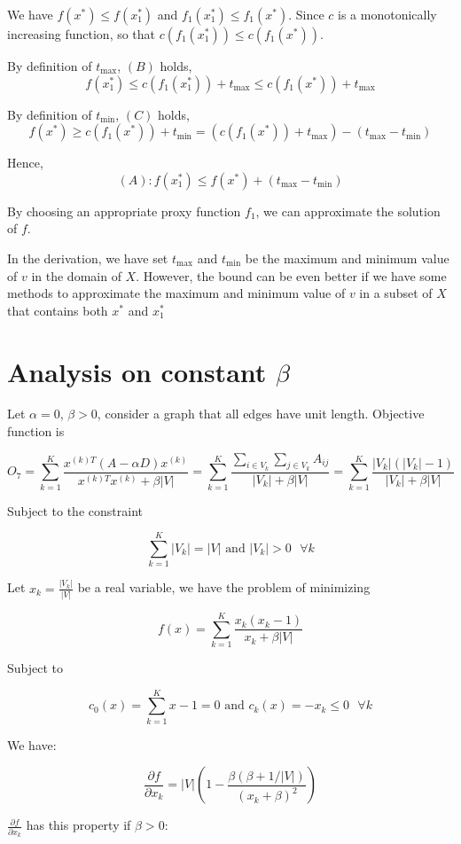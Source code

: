 We have $f(x^*) \leq f(x^*_1)$ and $f_1(x^*_1) \leq f_1(x^*)$.
Since $c$ is a monotonically increasing function, so that $c(f_1(x^*_1)) \leq c(f_1(x^*))$.


By definition of $t_{\max}$, $(B)$ holds,
\[
    f(x^*_1) \leq c(f_1(x^*_1)) + t_{\max} \leq c(f_1(x^*)) + t_{\max}
\]

By definition of $t_{\min}$, $(C)$ holds,
\[
    f(x^*) \geq c(f_1(x^*)) + t_{\min} = (c(f_1(x^*)) + t_{\max}) - (t_{\max} - t_{\min})
\]

Hence,
\[
    (A): f(x^*_1) \leq f(x^*) + (t_{\max} - t_{\min})
\]

By choosing an appropriate proxy function $f_1$, we can approximate the solution of $f$.

In the derivation, we have set $t_{\max}$ and $t_{\min}$ be the maximum and minimum value of $v$ in the domain of $X$.
However, the bound can be even better if we have some methods to approximate the maximum and minimum value of $v$ in a subset of $X$ that contains both $x^*$ and $x^*_1$

\section{Analysis on constant $\beta$}

Let $\alpha = 0$, $\beta > 0$, consider a graph that all edges have unit length. Objective function is

\[
O_7 = \sum_{k=1}^{K} \frac{x^{(k)T} (A - \alpha D) x^{(k)}}{x^{(k)T} x^{(k)} + \beta |V|}
=
\sum_{k=1}^{K} \frac{\sum_{i \in V_k} \sum_{j \in V_k} A_{ij}}{|V_k| + \beta |V|}
= 
\sum_{k=1}^{K} \frac{|V_k|(|V_k| - 1)}{|V_k| + \beta |V|}
\]

Subject to the constraint

\[
\sum_{k=1}^{K} |V_k| = |V| \text{ and } |V_k| > 0 \text{ } \forall k
\]

Let $x_k = \frac{|V_k|}{|V|}$ be a real variable, we have the problem of minimizing

\[
f(x) = \sum_{k=1}^{K} \frac{x_k (x_k-1)}{x_k+\beta |V|}
\]

Subject to 

\[
c_0(x) = \sum_{k=1}^{K} x - 1 = 0 \text{ and } c_k(x) = -x_k \leq 0 \text{ } \forall k
\]

We have:

\[
\frac{\partial f}{\partial x_k} = |V|(1 - \frac{\beta (\beta + 1/|V|)}{(x_k + \beta)^2})
\]


$\frac{\partial f}{\partial x_k}$ has this property if $\beta > 0$:

